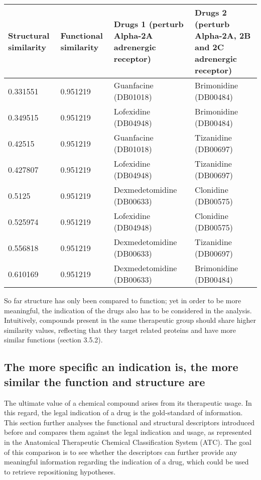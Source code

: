 \begin{center}
\footnotesize
    \begin{tabular}{| p{2cm} | p{2cm} | p{4cm} | p{4cm} |}
    \hline
Structural similarity & Functional similarity & Drugs 1 (perturb Alpha-2A adrenergic receptor) & Drugs 2 (perturb Alpha-2A, 2B and 2C adrenergic receptor)\\ \hline \hline
0.331551 & 0.951219 & Guanfacine (DB01018) & Brimonidine (DB00484) \\ \hline
0.349515 & 0.951219 & Lofexidine (DB04948) & Brimonidine (DB00484) \\ \hline
0.42515 & 0.951219 & Guanfacine (DB01018) & Tizanidine (DB00697) \\ \hline
0.427807 & 0.951219 & Lofexidine (DB04948) & Tizanidine (DB00697) \\ \hline
0.5125 & 0.951219 & Dexmedetomidine (DB00633) & Clonidine (DB00575) \\ \hline
0.525974 & 0.951219 & Lofexidine (DB04948) & Clonidine (DB00575) \\ \hline
0.556818 & 0.951219 & Dexmedetomidine (DB00633) & Tizanidine (DB00697) \\ \hline
0.610169 & 0.951219 & Dexmedetomidine (DB00633) & Brimonidine (DB00484) \\ \hline
    \end{tabular} 
    \label{table:lines}
\end{center}

So far structure has only been compared to function; yet in order to be more meaningful, the indication of the drugs also has to be considered in the analysis. Intuitively, compounds present in the same therapeutic group should share higher similarity values, reflecting that they target related proteins and have more similar functions (section 3.5.2).

\subsection{The more specific an indication is, the more similar the function and structure are}
The ultimate value of a chemical compound arises from its therapeutic usage. In this regard, the legal indication of a drug is the gold-standard of information. This section further analyses the functional and structural descriptors introduced before and compares them against the legal indication and usage, as represented in the Anatomical Therapeutic Chemical Classification System (ATC). The goal of this comparison is to see whether the descriptors can further provide any meaningful information regarding the indication of a drug, which could be used to retrieve repositioning hypotheses.


